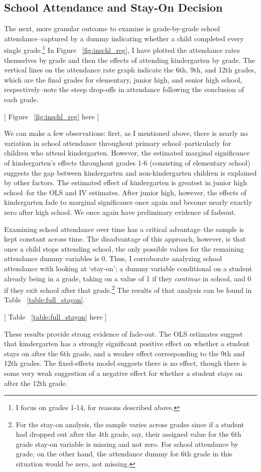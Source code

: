 \subsection{School Attendance and Stay-On Decision}
The next, more granular outcome to examine is grade-by-grade school attendance--captured by a dummy indicating whether a child completed every single grade.\footnote{ I focus on grades 1-14, for reasons described above.} In Figure ~\ref{fig:inschl_reg}, I have plotted the attendance rates themselves by grade and then the effects of attending kindergarten by grade. The vertical lines on the attendance rate graph indicate the 6th, 9th, and 12th grades, which are the final grades for elementary, junior high, and senior high school, respectively--note the steep drop-offs in attendance following the conclusion of each grade.
\begin{center}
	[ Figure ~\ref{fig:inschl_reg} here ]
\end{center}
We can make a few observations: first, as I mentioned above, there is nearly no variation in school attendance throughout primary school--particularly for children who attend kindergarten. However, the estimated marginal significance of kindergarten's effects throughout grades 1-6 (consisting of elementary school) suggests the gap between kindergarten and non-kindergarten children is explained by other factors. The estimated effect of kindergarten is greatest in junior high school--for the OLS and IV estimates. After junior high, however, the effects of kindergarten fade to marginal significance once again and become nearly exactly zero after high school. We once again have preliminary evidence of fadeout.

Examining school attendance over time has a critical advantage--the sample is kept constant across time. The disadvantage of this approach, however, is that once a child stops attending school, the only possible values for the remaining attendance dummy variables is 0. Thus, I corroborate analyzing school attendance with looking at `stay-on'; a dummy variable conditional on a student already being in a grade, taking on a value of 1 if they \textit{continue} in school, and 0 if they exit school after that grade.\footnote{For the stay-on analysis, the sample varies across grades since if a student had dropped out after the 4th grade, say, their assigned value for the 6th grade stay-on variable is missing and not zero. For school attendance by grade, on the other hand, the attendance dummy for 6th grade in this situation would be zero, not missing.} The results of that analysis can be found in Table ~\ref{table:full_stayon}.
\begin{center}
	[ Table ~\ref{table:full_stayon} here ]
\end{center}
These results provide strong evidence of fade-out. The OLS estimates suggest that kindergarten has a strongly significant positive effect on whether a student stays on after the 6th grade, and a weaker effect corresponding to the 9th and 12th grades. The fixed-effects model suggests there is no effect, though there is some very weak suggestion of a negative effect for whether a student stays on after the 12th grade. 

